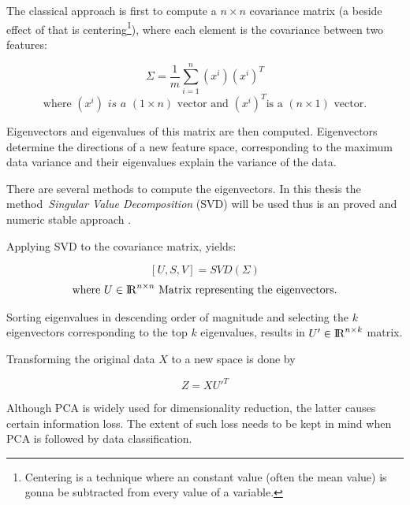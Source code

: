 The classical approach is first to compute a \(n \times n \) covariance matrix (a beside effect of that is centering\footnote{Centering is a technique where an constant value (often the mean value) is gonna be subtracted from every value of a variable.}), where each element is the covariance between two features:

\[ \Sigma = \frac{1}{m}\sum_{i = 1}^{n}(x^i)(x^i)^T\]
\[ \textrm{where }(x^i) \textit{ is a } (1 \times n) \textrm{ vector and } (x^i)^T \textrm{is a } (n \times 1) \textrm{ vector.}\]

Eigenvectors and eigenvalues of this matrix are then computed. Eigenvectors determine the directions of a new feature space, corresponding to the maximum data variance and their eigenvalues explain the variance of the data.

There are several methods to compute the eigenvectors.
In this thesis the method~\textit{Singular Value Decomposition} (SVD) will be used thus is an proved and numeric stable approach \cite{wall2003svd,zouht04}.  

Applying SVD to the covariance matrix, yields:

\[ [U,S,V] = SVD(\Sigma)\]
\[ \textrm{where  } U \in  {\rm I\!R}^{n \times n} \textrm{ Matrix representing the eigenvectors.}  \]

Sorting eigenvalues in descending order of magnitude and selecting the \( k \) eigenvectors corresponding to the top \( k \) eigenvalues, results in \( U' \in   {\rm I\!R}^{n \times k}\) matrix.

Transforming the original data \( X \) to a new space is done by

\[ Z = X U'^ T \]

Although PCA is widely used for dimensionality reduction, the latter causes certain information loss. The extent of such loss needs to be kept in mind when PCA is followed by data classification. 